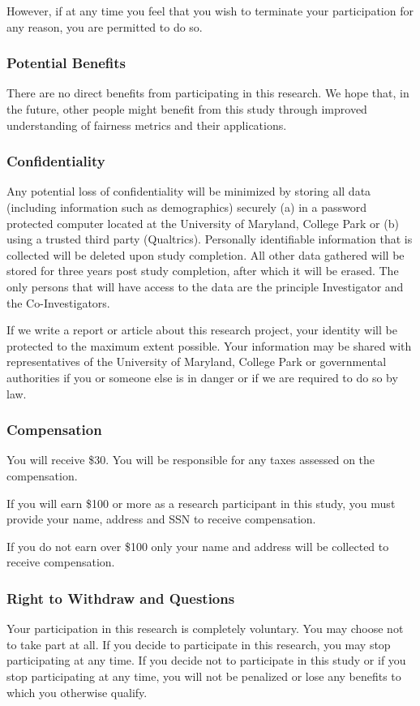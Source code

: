 \documentclass{article}
\begin{document}
However, if at any time you feel that you wish to terminate your participation for any reason, you are permitted to do so.

\subsubsection{Potential Benefits}
There are no direct benefits from participating in this research. We hope that, in the future, other people might benefit from this study through improved understanding of fairness metrics and their applications. 

\subsubsection{Confidentiality}
Any potential loss of confidentiality will be minimized by storing all data (including information such as demographics) securely (a) in a password protected computer located at the University of Maryland, College Park or (b) using a trusted third party (Qualtrics). Personally identifiable information that is collected will be deleted upon study completion. All other data gathered will be stored for three years post study completion, after which it will be erased. The only persons that will have access to the data are the principle Investigator and the Co-Investigators.

If we write a report or article about this research project, your identity will be protected to the maximum extent possible.  Your information may be shared with representatives of the University of Maryland, College Park or governmental authorities if you or someone else is in danger or if we are required to do so by law. 

\subsubsection{Compensation}
You will receive \$30.  You will be responsible for any taxes assessed on the compensation.  

If you will earn \$100 or more as a research participant in this study, you must provide your name, address and SSN to receive compensation.

If you do not earn over \$100 only your name and address will be collected to receive compensation.

\subsubsection{Right to Withdraw and Questions}
Your participation in this research is completely voluntary.  You may choose not to take part at all.  If you decide to participate in this research, you may stop participating at any time.  If you decide not to participate in this study or if you stop participating at any time, you will not be penalized or lose any benefits to which you otherwise qualify.
\end{document}
